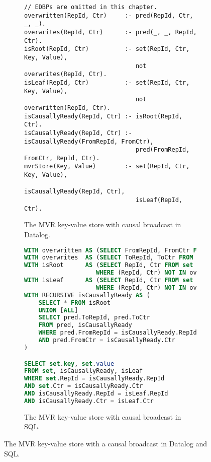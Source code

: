 \begin{figure}[tpb]
	\begin{subfigure}[b]{\textwidth}
		\begin{lstlisting}[keepspaces]
// EDBPs are omitted in this chapter.
overwritten(RepId, Ctr)     :- pred(RepId, Ctr, _, _).
overwrites(RepId, Ctr)      :- pred(_, _, RepId, Ctr).
isRoot(RepId, Ctr)          :- set(RepId, Ctr, Key, Value),
                               not overwrites(RepId, Ctr).
isLeaf(RepId, Ctr)          :- set(RepId, Ctr, Key, Value),
                               not overwritten(RepId, Ctr).
isCausallyReady(RepId, Ctr) :- isRoot(RepId, Ctr).
isCausallyReady(RepId, Ctr) :- isCausallyReady(FromRepId, FromCtr),
                               pred(FromRepId, FromCtr, RepId, Ctr).
mvrStore(Key, Value)        :- set(RepId, Ctr, Key, Value),
                               isCausallyReady(RepId, Ctr),
                               isLeaf(RepId, Ctr).\end{lstlisting}
		\caption{The \ac{MVR} key-value store with causal broadcast in Datalog.}\label{code:mvr-crdt-datalog}
	\end{subfigure}

	\vspace{1em}

	\begin{subfigure}[b]{\textwidth}
		\begin{lstlisting}[language=SQL]
WITH overwritten AS (SELECT FromRepId, FromCtr FROM pred)
WITH overwrites  AS (SELECT ToRepId, ToCtr FROM pred)
WITH isRoot      AS (SELECT RepId, Ctr FROM set
                    WHERE (RepId, Ctr) NOT IN overwrites)
WITH isLeaf      AS (SELECT RepId, Ctr FROM set
                    WHERE (RepId, Ctr) NOT IN overwritten)
WITH RECURSIVE isCausallyReady AS (
    SELECT * FROM isRoot
    UNION [ALL]
    SELECT pred.ToRepId, pred.ToCtr
    FROM pred, isCausallyReady
    WHERE pred.FromRepId = isCausallyReady.RepId
    AND pred.FromCtr = isCausallyReady.Ctr
)

SELECT set.key, set.value
FROM set, isCausallyReady, isLeaf
WHERE set.RepId = isCausallyReady.RepId
AND set.Ctr = isCausallyReady.Ctr
AND isCausallyReady.RepId = isLeaf.RepId
AND isCausallyReady.Ctr = isLeaf.Ctr\end{lstlisting}
		\caption{The \ac{MVR} key-value store with causal broadcast in SQL.}\label{code:mvr-crdt-sql}
	\end{subfigure}

	\caption{The \ac{MVR} key-value store with a causal broadcast in Datalog and SQL.}\label{code:mvr-crdt}
\end{figure}

